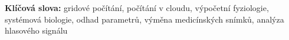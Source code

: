 {%
%





\textbf{Klíčová slova:}
gridové počítání, počítání v cloudu, výpočetní fyziologie, systémová biologie, odhad parametrů, výměna medicínských snímků, analýza hlasového signálu
\vss}
